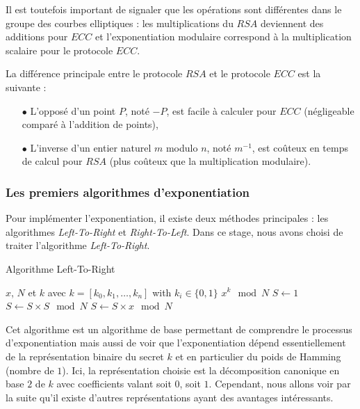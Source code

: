 \documentclass[12pt, a4paper]{memoir}
\begin{document}
Il est toutefois important de signaler que les opérations sont différentes dans le groupe des courbes elliptiques : 
les multiplications du $RSA$ deviennent des additions pour $ECC$ et l'exponentiation modulaire correspond
à la multiplication scalaire pour le protocole $ECC$.

La différence principale entre le protocole $RSA$ et le protocole $ECC$ est la suivante :
\begin{itemize}
 \item [$\bullet$] L'opposé d'un point $P$, noté $-P$, est facile à calculer pour $ECC$ 
 (négligeable comparé à l'addition de points),
 \item [$\bullet$] L'inverse d'un entier naturel $m$ modulo $n$, noté $m^{-1}$, 
 est coûteux en temps de calcul pour $RSA$ (plus coûteux que la multiplication modulaire).
\end{itemize}

\subsubsection{Les premiers algorithmes d'exponentiation}

Pour implémenter l'exponentiation, il existe deux méthodes principales : les algorithmes \emph{Left-To-Right} et \emph{Right-To-Left}.
Dans ce stage, nous avons choisi de traiter l'algorithme \emph{Left-To-Right}.

\begin{algorithm}
 \caption{Algorithme Left-To-Right}
 \begin{algorithmic}
  \REQUIRE $x$, $N$ et $k$ avec $k = [k_0,k_1,\ldots,k_n]$ with $k_i \in \{0,1\}$
  \ENSURE $x^k \mod N$
  \STATE $S \leftarrow 1$
  \STATE $S \leftarrow S \times S \mod N$
  \STATE $S \leftarrow S \times x \mod N$
  \ENDIF
  \ENDFOR
 \end{algorithmic}
\end{algorithm}

Cet algorithme est un algorithme de base permettant de comprendre le processus d'exponentiation mais aussi
de voir que l'exponentiation dépend essentiellement de la représentation binaire du secret $k$
et en particulier du poids de Hamming (nombre de $1$).
Ici, la représentation choisie est la décomposition canonique en base $2$ de $k$ avec coefficients valant soit $0$, soit $1$.
Cependant, nous allons voir par la suite qu'il existe d'autres représentations ayant des avantages intéressants. 
\end{document}
